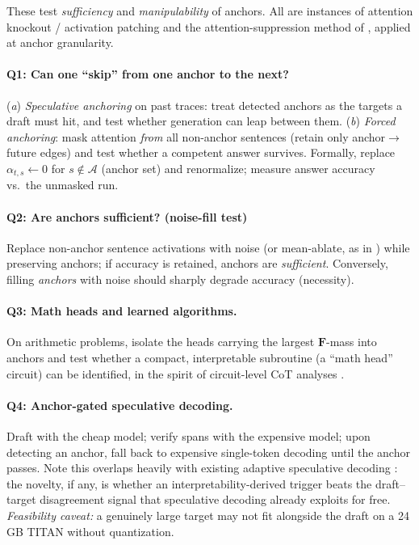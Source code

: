 \documentclass[11pt]{article}
\newcommand{\F}{\mathbf{F}}
\begin{document}
These test \emph{sufficiency} and \emph{manipulability} of anchors. All are instances of
attention knockout / activation patching \cite{rai2024how,wang2023interpretability} and the
attention-suppression method of \cite{bogdan2025thought}, applied at anchor granularity.

\paragraph{Q1: Can one ``skip'' from one anchor to the next?}
(\emph{a}) \emph{Speculative anchoring} on past traces: treat detected anchors as the targets a
draft must hit, and test whether generation can leap between them. (\emph{b}) \emph{Forced
anchoring}: mask attention \emph{from} all non-anchor sentences (retain only anchor$\to$future
edges) and test whether a competent answer survives. Formally, replace $\alpha_{t,s}\!\leftarrow\!0$
for $s\notin\mathcal A$ (anchor set) and renormalize; measure answer accuracy vs.\ the unmasked run.

\paragraph{Q2: Are anchors sufficient? (noise-fill test)}
Replace non-anchor sentence activations with noise (or mean-ablate, as in \cite{rai2024how}) while
preserving anchors; if accuracy is retained, anchors are \emph{sufficient}. Conversely, filling
\emph{anchors} with noise should sharply degrade accuracy (necessity).

\paragraph{Q3: Math heads and learned algorithms.}
On arithmetic problems, isolate the heads carrying the largest $\F$-mass into anchors and test
whether a compact, interpretable subroutine (a ``math head'' circuit) can be identified, in the
spirit of circuit-level CoT analyses \cite{rai2024how}.

\paragraph{Q4: Anchor-gated speculative decoding.}
Draft with the cheap model; verify spans with the expensive model; upon detecting an anchor,
fall back to expensive single-token decoding until the anchor passes. Note this overlaps heavily
with existing adaptive speculative decoding \cite{liao2025reward,leviathan2023fast}: the novelty,
if any, is whether an interpretability-derived trigger beats the draft--target disagreement signal
that speculative decoding already exploits for free. \emph{Feasibility caveat:} a genuinely large
target may not fit alongside the draft on a 24\,GB TITAN without quantization.
\end{document}
